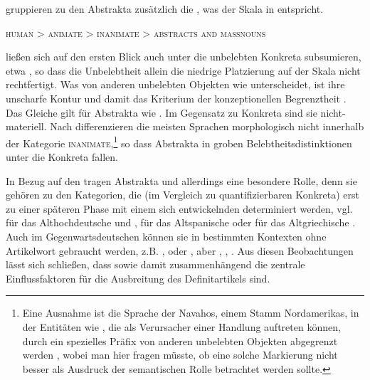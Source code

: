 \textcite[194]{Enger2011} gruppieren zu den Abstrakta  zusätzlich die  , was der Skala in  entspricht. 

\begin{exe}
	\ex \label{ex:einfachbelebt} \textsc{human > animate > inanimate  > abstracts and massnouns}
	\end{exe}
\noindent
{} ließen sich auf den ersten Blick auch unter die unbelebten  Konkreta  subsumieren, etwa , so dass die Unbelebtheit  allein die niedrige Platzierung auf der Skala nicht rechtfertigt. Was  von anderen unbelebten  Objekten wie  unterscheidet, ist ihre unscharfe Kontur und damit das Kriterium der konzeptionellen Begrenztheit \parencite[203--207]{Langacker1987}. Das Gleiche gilt für Abstrakta  wie . Im Gegensatz zu  Konkreta sind sie nicht-materiell. Nach \textcite[197]{Comrie1989} differenzieren die meisten Sprachen morphologisch nicht innerhalb der Kategorie \textsc{inanimate},\footnote{Eine Ausnahme ist die Sprache der Navahos, einem Stamm Nordamerikas, in der Entitäten wie , die als Verursacher einer Handlung auftreten können, durch ein spezielles Präfix von anderen unbelebten  Objekten abgegrenzt  werden \parencite[197]{Comrie1989}, wobei man hier fragen müsste, ob eine solche Markierung nicht besser als Ausdruck der semantischen Rolle   \parencite[73]{Primus2012} betrachtet werden sollte.} so dass Abstrakta  in groben Belebtheitsdistinktionen unter die Konkreta  fallen.

In Bezug auf den  tragen Abstrakta  und  allerdings eine besondere Rolle, denn sie gehören zu den Kategorien, die (im Vergleich zu quantifizierbaren  Konkreta) erst zu einer späteren Phase mit einem sich entwickelnden  determiniert werden, vgl. für das Althochdeutsche \textcite{Oubouzar1992} und \textcite{Szczepaniak2011}, für das Altspanische \textcite{Company1991}  oder für das Altgriechische \textcite{Napoli2009}. Auch im Gegenwartsdeutschen können sie in bestimmten Kontexten ohne Artikelwort gebraucht werden, z.B. ,   oder  \parencite{DAvis2013}, aber , , . Aus diesen Beobachtungen lässt sich schließen, dass  sowie damit zusammenhängend die  zentrale Einflussfaktoren für die Ausbreitung des Definitartikels  sind. 

